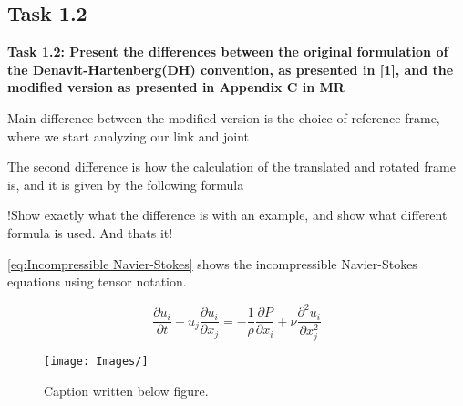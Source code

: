 \subsection{Task 1.2}
\textbf{Task 1.2: Present the differences between the original formulation of the Denavit-Hartenberg(DH) convention, as presented in [1], and the modified version as presented in Appendix C in MR}

Main difference between the modified version is the choice of reference frame, where we start analyzing our link and joint

The second difference is how the calculation of the translated and rotated frame is, and it is given by the following formula

!Show exactly what the difference is with an example, and show what different formula is used. And thats it!


\eqref{eq:Incompressible Navier-Stokes} shows the incompressible Navier-Stokes equations using tensor notation.

\begin{equation}
    \frac{\partial u_i}{\partial t} + u_j \frac{\partial u_i}{\partial x_j} = -\frac{1}{\rho} \frac{\partial P}{\partial x_i} + \nu \frac{\partial^2 u_i}{\partial x_j^2}
    \label{eq:Incompressible Navier-Stokes}
\end{equation}

\begin{figure}[H]
    \centering
    \texttt{[image: Images/]}
    \caption[Caption used in list of tables]{Caption written below figure.}
    \label{fig:flow around cylinder}
\end{figure}

